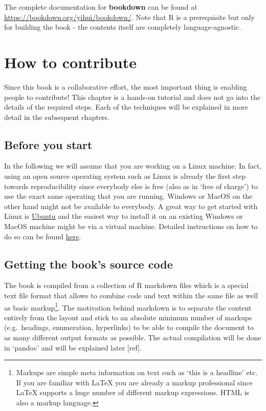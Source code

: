 \documentclass[]{book}
\let\rmarkdownfootnote\footnote%
\def\footnote{\protect\rmarkdownfootnote}
\begin{document}
The complete documentation for \textbf{bookdown} can be found at
\url{https://bookdown.org/yihui/bookdown/}. Note that R is a
prerequisite but only for building the book - the contents itself are
completely language-agnostic.

\chapter{How to contribute}\label{how-to-contribute}

Since this book is a collaborative effort, the most important thing is
enabling people to contribute! This chapter is a hands-on tutorial and
does not go into the details of the required steps. Each of the
techniques will be explained in more detail in the subsequent chapters.

\section{Before you start}\label{before-you-start}

In the following we will assume that you are working on a Linux machine.
In fact, using an open source operating system such as Linux is already
the first step towards reproducibility since everybody else is free
(also as in `free of charge') to use the exact same operating that you
are running. Windows or MacOS on the other hand might not be available
to everybody. A great way to get started with Linux is
\href{https://www.ubuntu.com/download/desktop}{Ubuntu} and the easiest
way to install it on an existing Windows or MacOS machine might be via a
virtual machine. Detailed instructions on how to do so can be found
\href{https://www.wikihow.com/Install-Ubuntu-on-VirtualBox}{here}.

\section{Getting the book's source
code}\label{getting-the-books-source-code}

The book is compiled from a collection of R markdown files which is a
special text file format that allows to combine code and text within the
same file as well as basic markup\footnote{Markups are simple meta
  information on text such as `this is a headline' etc. If you are
  familiar with LaTeX you are already a markup professional since LaTeX
  supports a huge number of different markup expressions. HTML is also a
  markup language.}. The motivation behind markdown is to separate the
content entirely from the layout and stick to an absolute minimum number
of markups (e.g.~headings, enumeration, hyperlinks) to be able to
compile the document to as many different output formats as possible.
The actual compilation will be done in `pandoc' and will be explained
later {[}ref{]}.
\end{document}
